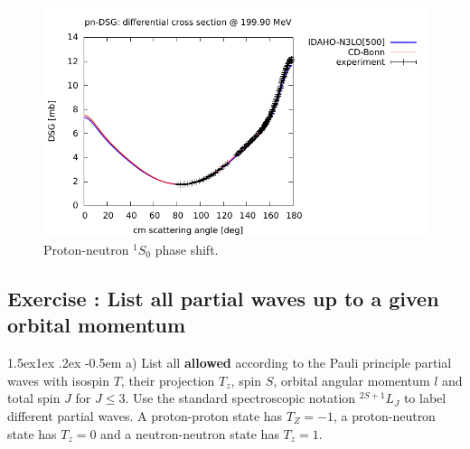 \documentclass[%
oneside,                 %
final,                   %
10pt]{article}
\makeatletter
\newenvironment{doconceexercise}{}{}
\newcounter{doconceexercisecounter}
\newcommand\subex{\@startsection{paragraph}{4}{\z@}%
                  {1.5ex\@plus1ex \@minus.2ex}%
                  {-0.5em}%
                  {\normalfont\normalsize\bfseries}}
\makeatother
\begin{document}
\begin{figure}[t]
  \centerline{\includegraphics[width=0.8\linewidth]{fig-forces/pnDSG_at_199MeV.pdf}}
  \caption{
  Proton-neutron $^1S_0$ phase shift.
  }
\end{figure}




\begin{doconceexercise}

\subsection*{Exercise \thedoconceexercisecounter: List all partial waves up to a given orbital momentum}



\subex{a)}
List all \textbf{allowed} according to the Pauli principle partial waves with isospin $T$, their 
projection $T_z$, spin $S$, orbital angular momentum $l$ and total spin $J$ for $J\le 3$.
Use the standard spectroscopic notation $^{2S+1}L_J$ to label different partial waves. A proton-proton state
has $T_Z=-1$, a proton-neutron state has $T_z=0$ and a neutron-neutron state has $T_z=1$.

\end{doconceexercise}
\end{document}
